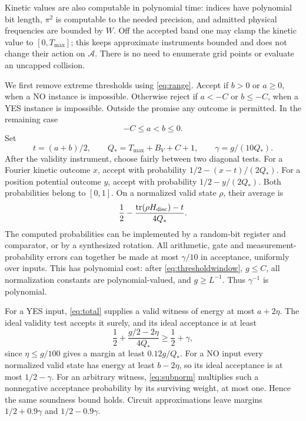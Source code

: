 \documentclass[11pt]{article}
\theoremstyle{remark}\newtheorem{remark}[theorem]{Remark}
\numberwithin{equation}{section}
\begin{document}
Kinetic values are also computable in polynomial time: indices have
polynomial bit length, $\pi^2$ is computable to the needed precision, and
admitted physical frequencies are bounded by $W$. Off the accepted band
one may clamp the kinetic value to $[0,T_{\max}]$; this keeps approximate
instruments bounded and does not change their action on $\mathcal A$.
There is no need to enumerate grid points or evaluate an uncapped collision.

We first remove extreme thresholds using \eqref{eq:range}. Accept if
$b>0$ or $a\geq0$, when a NO instance is impossible. Otherwise reject if
$a<-C$ or $b\leq-C$, when a YES instance is impossible. Outside the promise
any outcome is permitted. In the remaining case
\begin{equation}\label{eq:thresholdwindow}
 -C\leq a<b\leq0.
\end{equation}
Set
\begin{equation}\label{eq:normalization}
 t=(a+b)/2,\qquad Q_*=T_{\max}+B_V+C+1,
 \qquad \gamma=g/(10Q_*).
\end{equation}
After the validity instrument, choose fairly between two diagonal tests.
For a Fourier kinetic outcome $x$, accept with probability
$1/2-(x-t)/(2Q_*)$. For a position potential outcome $y$, accept with
probability $1/2-y/(2Q_*)$. Both probabilities belong to $[0,1]$.
On a normalized valid state $\rho$, their average is
\begin{equation}\label{eq:accept}
 \frac12-\frac{\operatorname{tr}(\rho H_{\rm disc})-t}{4Q_*}.
\end{equation}
The computed probabilities can be implemented by a random-bit register
and comparator, or by a synthesized rotation. All arithmetic, gate and
measurement-probability errors can together be made at most $\gamma/10$
in acceptance, uniformly over inputs. This has polynomial cost: after
\eqref{eq:thresholdwindow}, $g\leq C$, all normalization constants are
polynomial-valued, and $g\geq L^{-1}$. Thus $\gamma^{-1}$ is polynomial.

For a YES input, \eqref{eq:total} supplies a valid witness of energy at most
$a+2\eta$. The ideal validity test accepts it surely, and its ideal
acceptance is at least
\[
 \frac12+\frac{g/2-2\eta}{4Q_*}\geq\frac12+\gamma,
\]
since $\eta\leq g/100$ gives a margin at least $0.12g/Q_*$.
For a NO input every normalized valid state has energy at least
$b-2\eta$, so its ideal acceptance is at most $1/2-\gamma$.
For an arbitrary witness, \eqref{eq:subnorm} multiplies such a nonnegative
acceptance probability by its surviving weight, at most one. Hence the
same soundness bound holds. Circuit approximations leave margins
$1/2+0.9\gamma$ and $1/2-0.9\gamma$.
\end{document}
